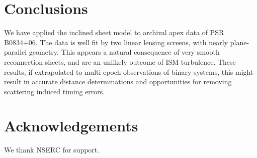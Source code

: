 \documentclass[useAMS,usenatbib]{mn2e}
\begin{document}
\section{Conclusions}

We have applied the \citep{2014MNRAS.442.3338P} inclined
sheet model to archival apex data of PSR B0834+06.  The data is well
fit by two linear lensing screens, with nearly plane-parallel
geometry.  This appears a natural consequence of very smooth
reconnection sheets, and are an unlikely outcome of ISM turbulence.
These results, if extrapolated to multi-epoch observations of binary
systems, this might result in accurate distance determinations and
opportunities for removing scattering induced timing errors.


\section{Acknowledgements}

We thank NSERC for support.


\newcommand{\araa}{ARA\&A}   %
\newcommand{\afz}{Afz}       %
\newcommand{\aj}{AJ}         %
\newcommand{\azh}{AZh}       %
\newcommand{\aaa}{A\&A}      %
\newcommand{\aas}{A\&AS}     %
\newcommand{\aar}{A\&AR}     %
\newcommand{\apj}{ApJ}       %
\newcommand{\apjs}{ApJS}     %
\newcommand{\apjl}{ApJ}      %
\newcommand{\apss}{Ap\&SS}   %
\newcommand{\baas}{BAAS}     %
\newcommand{\jaa}{JA\&A}     %
\newcommand{\mnras}{MNRAS}   %
\newcommand{\nat}{Nat}       %
\newcommand{\pasj}{PASJ}     %
\newcommand{\pasp}{PASP}     %
\newcommand{\paspc}{PASPC}   %
\newcommand{\qjras}{QJRAS}   %
\newcommand{\sci}{Sci}       %
\newcommand{\solphys}{Solar Physics}       %
\newcommand{\sova}{SvA}      %
\newcommand{\aap}{A\&A}
\newcommand\jcap{{J. Cosmology Astropart. Phys.}}%
\newcommand{\prd}{Phys. Rev. D}






\label{lastpage}
\end{document}
